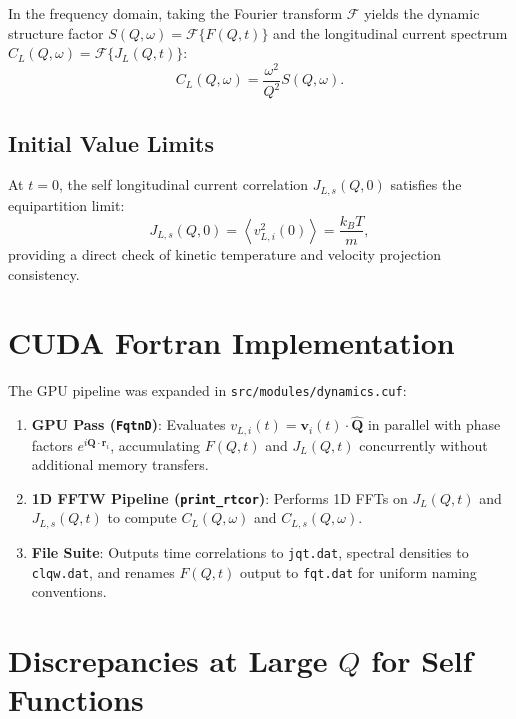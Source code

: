 \documentclass[11pt,a4paper]{article}
\begin{document}
In the frequency domain, taking the Fourier transform $\mathcal{F}$ yields the dynamic structure factor $S(Q,\omega) = \mathcal{F}\{F(Q,t)\}$ and the longitudinal current spectrum $C_L(Q,\omega) = \mathcal{F}\{J_L(Q,t)\}$:
\begin{equation}
C_L(Q,\omega) = \frac{\omega^2}{Q^2} S(Q,\omega).
\end{equation}

\subsection{Initial Value Limits}
At $t = 0$, the self longitudinal current correlation $J_{L,s}(Q,0)$ satisfies the equipartition limit:
\begin{equation}
J_{L,s}(Q,0) = \left\langle v_{L,i}^2(0) \right\rangle = \frac{k_B T}{m},
\end{equation}
providing a direct check of kinetic temperature and velocity projection consistency.

\section{CUDA Fortran Implementation}

The GPU pipeline was expanded in \texttt{src/modules/dynamics.cuf}:
\begin{enumerate}
    \item \textbf{GPU Pass (\texttt{FqtnD})}: Evaluates $v_{L,i}(t) = \mathbf{v}_i(t) \cdot \hat{\mathbf{Q}}$ in parallel with phase factors $e^{i \mathbf{Q} \cdot \mathbf{r}_i}$, accumulating $F(Q,t)$ and $J_L(Q,t)$ concurrently without additional memory transfers.
    \item \textbf{1D FFTW Pipeline (\texttt{print\_rtcor})}: Performs 1D FFTs on $J_L(Q,t)$ and $J_{L,s}(Q,t)$ to compute $C_L(Q,\omega)$ and $C_{L,s}(Q,\omega)$.
    \item \textbf{File Suite}: Outputs time correlations to \texttt{jqt.dat}, spectral densities to \texttt{clqw.dat}, and renames $F(Q,t)$ output to \texttt{fqt.dat} for uniform naming conventions.
\end{enumerate}

\section{Discrepancies at Large $Q$ for Self Functions}
\end{document}
